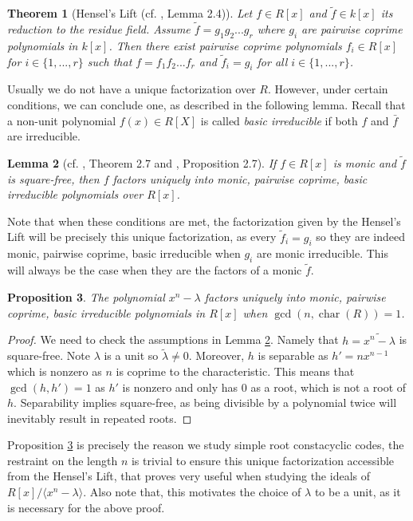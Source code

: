 \documentclass[a4paper, 12pt]{amsart}
\newtheorem{lemma}{Lemma}[section]
\newtheorem{theorem}[lemma]{Theorem}
\newtheorem{proposition}[lemma]{Proposition}
\theoremstyle{definition}
\newcommand{\lm}{\lambda}
\DeclareMathOperator{\Char}{char}
\numberwithin{equation}{section}
\numberwithin{table}{section}
\begin{document}
\begin{theorem}[Hensel's Lift (cf. \cite{Dinh}, Lemma 2.4)]
    Let $f \in R[x]$ and $\tilde f\in k[x]$ its reduction to the residue field. Assume $\tilde f = g_1g_2...g_r$ where $g_i$ are pairwise coprime polynomials in $k[x]$. Then there exist pairwise coprime polynomials $f_i \in R[x]$ for $i \in \{1,...,r\}$ such that $f = f_1f_2...f_r$ and $\tilde f_i = g_i$ for all $i \in \{1,...,r\}$.
\end{theorem}

Usually we do not have a unique factorization over $R$. However, under certain conditions, we can conclude one, as described in the following lemma. Recall that a non-unit polynomial $f(x) \in R[X]$ is called \emph{basic irreducible} if
both $f$ and $\bar{f}$ are irreducible.

\begin{lemma}[cf. \cite{Norton2000-it}, Theorem 2.7 and \cite{Dinh}, Proposition 2.7]\label{uniquefact}
    If $f\in R[x]$ is monic and $\tilde{f}$ is square-free, then $f$ factors uniquely into monic, pairwise coprime, basic irreducible polynomials over $R[x]$.
\end{lemma}

Note that when these conditions are met, the factorization given by the Hensel's Lift will be precisely this unique factorization, as every $\tilde f_i = g_i$ so they are indeed monic, pairwise coprime, basic irreducible when $g_i$ are monic irreducible. This will always be the case when they are the factors of a monic $\tilde f$.

\begin{proposition}\label{uniquefact2}
    The polynomial $x^n-\lm$ factors uniquely into monic, pairwise coprime, basic irreducible polynomials in $R[x]$ when $\gcd(n,\Char(R))=1$.
\end{proposition}

\begin{proof}
    We need to check the assumptions in Lemma \ref{uniquefact}. Namely that $h = \widetilde{x^n - \lm}$ is square-free. Note $\lm$ is a unit so $\tilde\lm \neq 0$. Moreover, $h$ is separable as $h' = nx^{n-1}$ which is nonzero as $n$ is coprime to the characteristic. This means that $\gcd(h,h') =1$ as $h'$ is nonzero and only has $0$ as a root, which is not a root of $h$. Separability implies square-free, as being divisible by a polynomial twice will inevitably result in repeated roots.
\end{proof}


Proposition \ref{uniquefact2} is precisely the reason we study simple root constacyclic codes, the restraint on the length $n$ is trivial to ensure this unique factorization accessible from the Hensel's Lift, that proves very useful when studying the ideals of $R[x]/\langle x^n-\lm \rangle$. Also note that,  this motivates the choice of $\lm$ to be a unit, as it is necessary for the above proof.
\end{document}
